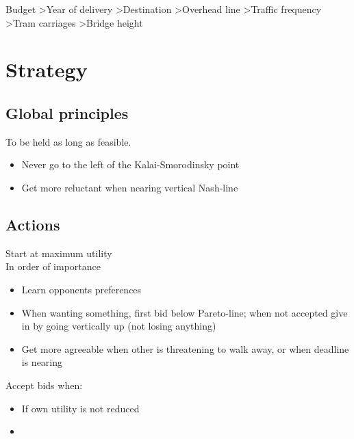 \documentclass{article}
\begin{document}
Budget \textgreater Year of delivery \textgreater Destination \textgreater Overhead line \textgreater Traffic frequency \textgreater Tram carriages \textgreater Bridge height\\


\section{Strategy}

\subsection{Global principles}
To be held as long as feasible.
\begin{itemize}
\item Never go to the left of the Kalai-Smorodinsky point
\item Get more reluctant when nearing vertical Nash-line
\end{itemize}

\subsection{Actions}
Start at maximum utility\\

\noindent
In order of importance
\begin{itemize}
\item Learn opponents preferences
\item When wanting something, first bid below Pareto-line; when not accepted give in by going vertically up (not losing anything)
\item Get more agreeable when other is threatening to walk away, or when deadline is nearing
\end{itemize}

Accept bids when:
\begin{itemize}
\item If own utility is not reduced
\item 
\end{itemize}
\end{document}
